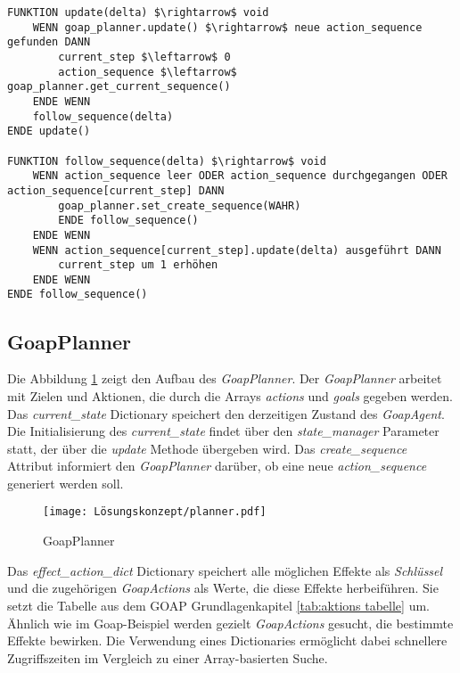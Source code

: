 \begin{lstlisting}[language=Pseudo, caption={update Methode des GoapAgent}, mathescape=true, label={lst:pseudo update}]
FUNKTION update(delta) $\rightarrow$ void
    WENN goap_planner.update() $\rightarrow$ neue action_sequence gefunden DANN
        current_step $\leftarrow$ 0
        action_sequence $\leftarrow$ goap_planner.get_current_sequence()
    ENDE WENN
    follow_sequence(delta)
ENDE update()

FUNKTION follow_sequence(delta) $\rightarrow$ void
	WENN action_sequence leer ODER action_sequence durchgegangen ODER action_sequence[current_step] DANN
		goap_planner.set_create_sequence(WAHR)
		ENDE follow_sequence()
	ENDE WENN
	WENN action_sequence[current_step].update(delta) ausgeführt DANN
		current_step um 1 erhöhen
	ENDE WENN
ENDE follow_sequence()
\end{lstlisting}














\subsection{GoapPlanner}
\label{chap:goapplanner uml}

Die Abbildung \ref{fig:goapplanner uml} zeigt den Aufbau des \textit{GoapPlanner}. Der \textit{GoapPlanner} arbeitet mit Zielen und Aktionen, die durch die Arrays \textit{actions} und \textit{goals} gegeben werden. Das \textit{current\_state} Dictionary speichert den derzeitigen Zustand des \textit{GoapAgent}. Die Initialisierung des \textit{current\_state} findet über den \textit{state\_manager} Parameter statt, der über die \textit{update} Methode übergeben wird. Das \textit{create\_sequence} Attribut informiert den \textit{GoapPlanner} darüber, ob eine neue \textit{action\_sequence} generiert werden soll. 

\begin{figure}[h]
  \centering
  \texttt{[image: Lösungskonzept/planner.pdf]}
	\captionsetup{justification=justified, format=plain}
  \caption{GoapPlanner}
  \label{fig:goapplanner uml}
\end{figure}

Das \textit{effect\_action\_dict} Dictionary speichert alle möglichen Effekte als \textit{Schlüssel} und die zugehörigen \textit{GoapActions} als Werte, die diese Effekte herbeiführen. Sie setzt die Tabelle aus dem GOAP Grundlagenkapitel \ref{tab:aktions tabelle} um. Ähnlich wie im Goap-Beispiel werden gezielt \textit{GoapActions} gesucht, die bestimmte Effekte bewirken. Die Verwendung eines Dictionaries ermöglicht dabei schnellere Zugriffszeiten im Vergleich zu einer Array-basierten Suche.

